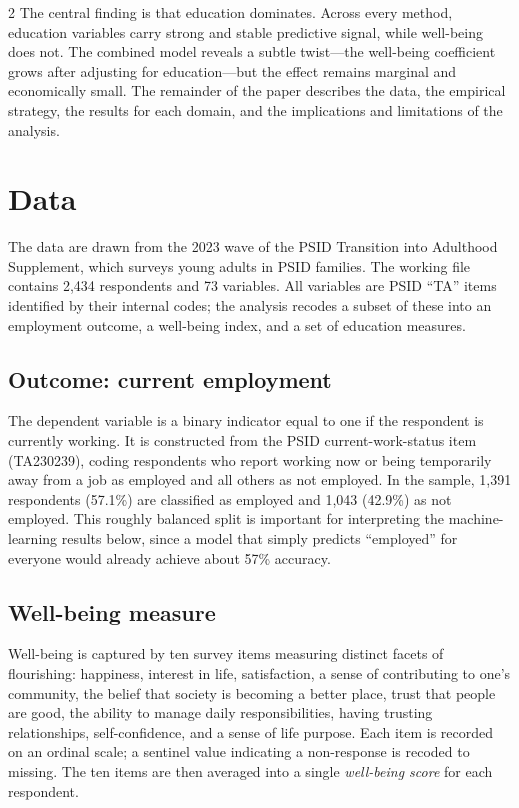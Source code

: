 \documentclass[
  11pt,
]{article}
\begin{document}
\begin{multicols}{2}
The central finding is that education dominates. Across every method, education variables carry strong and stable predictive signal, while well-being does not. The combined model reveals a subtle twist---the well-being coefficient grows after adjusting for education---but the effect remains marginal and economically small. The remainder of the paper describes the data, the empirical strategy, the results for each domain, and the implications and limitations of the analysis.

\section{Data}
The data are drawn from the 2023 wave of the PSID Transition into Adulthood Supplement, which surveys young adults in PSID families. The working file contains 2{,}434 respondents and 73 variables. All variables are PSID ``TA'' items identified by their internal codes; the analysis recodes a subset of these into an employment outcome, a well-being index, and a set of education measures.

\subsection{Outcome: current employment}
The dependent variable is a binary indicator equal to one if the respondent is currently working. It is constructed from the PSID current-work-status item (TA230239), coding respondents who report working now or being temporarily away from a job as employed and all others as not employed. In the sample, 1{,}391 respondents (57.1\%) are classified as employed and 1{,}043 (42.9\%) as not employed. This roughly balanced split is important for interpreting the machine-learning results below, since a model that simply predicts ``employed'' for everyone would already achieve about 57\% accuracy.

\subsection{Well-being measure}
Well-being is captured by ten survey items measuring distinct facets of flourishing: happiness, interest in life, satisfaction, a sense of contributing to one's community, the belief that society is becoming a better place, trust that people are good, the ability to manage daily responsibilities, having trusting relationships, self-confidence, and a sense of life purpose. Each item is recorded on an ordinal scale; a sentinel value indicating a non-response is recoded to missing. The ten items are then averaged into a single \emph{well-being score} for each respondent.


\end{multicols}
\end{document}

